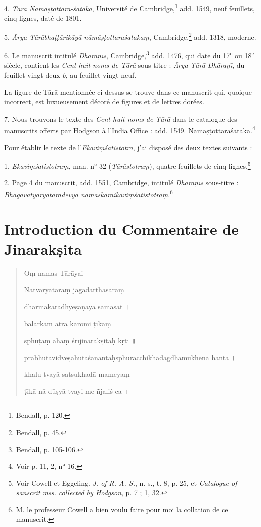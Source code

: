 \documentclass[a4paper, 11pt, oneside, french]{article}
\begin{document}
4. \emph{T\={a}r\={a} N\={a}m\={a}\d{s}\d{t}ottara-\'{s}ataka}, Université de Cambridge,\footnote{Bendall, p. 120.} add. 1549, neuf feuillets, cinq lignes, daté de 1801.

5. \emph{\={A}rya T\={a}r\={a}bha\d{t}\d{t}\={a}rik\={a}y\={a} n\={a}m\={a}\d{s}\d{t}ottara\'{s}ataka\d{m}}, Cambridge,\footnote{Bendall, p. 45.} add. 1318, moderne.

6. Le manuscrit intitulé \emph{Dh\={a}ra\d{n}\={\i}s}, Cambridge,\footnote{Bendall, p. 105-106.} add. 1476, qui date du 17\textsuperscript{e} ou 18\textsuperscript{e} siècle, contient les \emph{Cent huit noms de T\={a}r\={a}} sous titre : \emph{\={A}rya T\={a}r\={a} Dh\={a}ra\d{n}\={\i}}, du feuillet vingt-deux \emph{b}, au feuillet vingt-neuf.

La figure de T\={a}r\={a} mentionnée ci-dessus se trouve dans ce manuscrit qui, quoique incorrect, est luxueusement décoré de figures et de lettres dorées.

7. Nous trouvons le texte des \emph{Cent huit noms de T\={a}r\={a}} dans le catalogue des manuscrits offerts par Hodgson à l'India Office : add. 1549. N\={a}m\={a}\d{s}\d{t}ottara\'{s}ataka.\footnote{Voir p. 11, 2, n° 16.}

\bigskip

Pour établir le texte de l'\emph{Ekavi\d{m}\'{s}atistotra}, j'ai disposé des deux textes suivants :

1. \emph{Ekavi\d{m}\'{s}atistotra\d{m}}, man. n° 32 (\emph{T\={a}r\={a}stotra\d{m}}), quatre feuillets de cinq lignes.\footnote{Voir Cowell et Eggeling. \emph{J. of R. A. S.}, n. s., t. 8, p. 25, et \emph{Catalogue of sanscrit mss. collected by Hodgson}, p. 7 ; 1, 32.}

2. Page 4 du manuscrit, add. 1551, Cambridge, intitulé \emph{Dh\={a}ra\d{n}\={\i}s} sous-titre : \emph{Bhagavaty\={a}ryat\={a}r\={a}devy\={a} namask\={a}raikavi\d{m}\'{s}atistotra\d{m}}.\footnote{M. le professeur Cowell a bien voulu faire pour moi la collation de ce manuscrit.}
\clearpage
\section{Introduction du Commentaire de Jinarak\d{s}ita}
\begin{quotation}
O\d{m} namas T\={a}r\={a}yai

\bigskip

Natv\={a}ryat\={a}r\={a}\d{m} jagadarthas\={a}r\={a}\d{m}

dharm\={a}kar\={a}dhye\d{s}a\d{n}ay\={a} sam\={a}s\={a}t \texthindi{।}

b\={a}l\={a}rkam atra karomi \d{t}\={\i}k\={a}\d{m}

sphu\d{t}\={a}\d{m} aha\d{m} \'{s}r\={\i}jinarak\d{s}ita\d{h} k\d{r}t\={\i} \texthindi{॥}

\bigskip

prabh\={u}tavidve\d{s}ahut\={a}\'{s}an\={a}nta\d{h}sphuracchikh\={a}dagdhamukhena hanta \texthindi{।}

khalu tvay\={a} satsukhad\={a} mameya\d{m}

\d{t}\={\i}k\={a} n\={a} d\={u}\d{s}y\={a} tvayi me \~{n}jali\'{s} ca \texthindi{॥}
\end{quotation}
\end{document}
